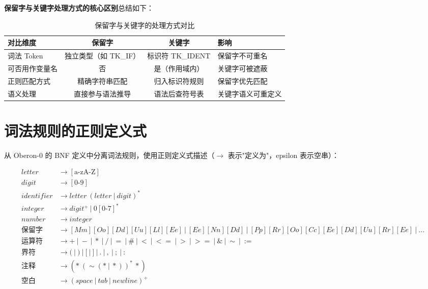 \textbf{保留字与关键字处理方式的核心区别}总结如下：

\begin{table}[htbp]
    \centering
    \begin{tabular}{|p{2.5cm}|c|c|l|}
    \hline
    \textbf{对比维度} & \textbf{保留字} & \textbf{关键字} & \textbf{影响} \\
    \hline
    词法 Token & 独立类型（如 TK\_IF） & 标识符 TK\_IDENT & 保留字不可重名 \\
    可否用作变量名 & 否 & 是（作用域内） & 关键字可被遮蔽 \\
    正则匹配方式 & 精确字符串匹配 & 归入标识符规则 & 保留字优先匹配 \\
    语义处理 & 直接参与语法推导 & 语法后查符号表 & 关键字语义可重定义 \\
    \hline
    \end{tabular}
    \caption{保留字与关键字的处理方式对比}
    \label{tab:rw-vs-kw}
\end{table}

\section{词法规则的正则定义式}

从 Oberon-0 的 BNF 定义中分离词法规则，使用正则定义式描述（$\to$ 表示"定义为"，epsilon 表示空串）：

\begin{align*}
    letter &\to [\text{a-zA-Z}] \\
    digit &\to [0\text{-}9] \\
    identifier &\to letter\ (letter\ |\ digit)^* \\
    integer &\to digit^+ \ |\ 0[0\text{-}7]^* \\
    number &\to integer \\
    \text{保留字} &\to [Mm][Oo][Dd][Uu][Ll][Ee]\ |\ [Ee][Nn][Dd]\ |\ [Pp][Rr][Oo][Cc][Ee][Dd][Uu][Rr][Ee]\ |\ \dots \\
    \text{运算符} &\to +\ |\ -\ |\ *\ |\ /\ |\ =\ |\ \#\ |\ <\ |\ <=\ |\ >\ |\ >=\ |\ \&\ |\ \sim\ |\ := \\
    \text{界符} &\to (\ |\ )\ |\ [\ |\ ]\ |\ .\ |\ ,\ |\ ;\ |\ : \\
    \text{注释} &\to (*\ (\sim(*\ |\ *))^*\ *) \\
    \text{空白} &\to (space\ |\ tab\ |\ newline)^+
\end{align*}


